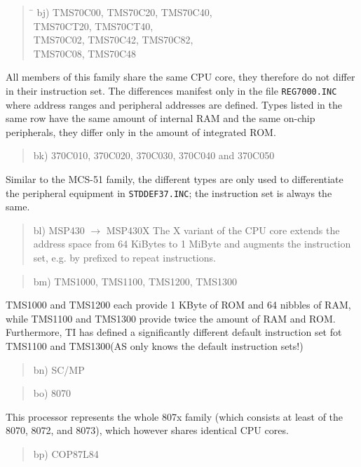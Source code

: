 \documentclass[12pt,twoside]{report}
\newcommand{\tty}[1]{{\tt #1}}
\begin{document}
\begin{quote}
\begin{tabbing}
\hspace{0.7cm} \= \kill
bj) \> TMS70C00, TMS70C20, TMS70C40,\\
    \> TMS70CT20, TMS70CT40,\\
    \> TMS70C02, TMS70C42, TMS70C82,\\
    \> TMS70C08, TMS70C48\\
\end{tabbing}
\end{quote}
All members of this family share the same CPU core, they therefore do not
differ in their instruction set.  The differences manifest only in the
file \tty{REG7000.INC} where address ranges and peripheral addresses are
defined.  Types listed in the same row have the same amount of internal
RAM and the same on-chip peripherals, they differ only in the amount of
integrated ROM.
\begin{quote}
bk) 370C010, 370C020, 370C030, 370C040 and 370C050
\end{quote}
Similar to the MCS-51 family, the different types are only used to
differentiate the peripheral equipment in \tty{STDDEF37.INC}; the
instruction set is always the same.
\begin{quote}
bl) MSP430 $\rightarrow$ MSP430X
The X variant of the CPU core extends the address space from 64
KiBytes to 1 MiByte and augments the instruction set, e.g. by
prefixed to repeat instructions.
\end{quote}
\begin{quote}
bm) TMS1000, TMS1100, TMS1200, TMS1300
\end{quote}
TMS1000 and TMS1200 each provide 1 KByte of ROM and 64 nibbles of
RAM, while TMS1100 and TMS1300 provide twice the amount of RAM
and ROM.  Furthermore, TI has defined a significantly different
default instruction set fot TMS1100 and TMS1300(AS only knows the
default instruction sets!)
\begin{quote}
bn) SC/MP
\end{quote}
\begin{quote}
bo) 8070
\end{quote}
This processor represents the whole 807x family (which consists at least
of the 8070, 8072, and 8073), which however shares identical CPU cores.
\begin{quote}
bp) COP87L84
\end{quote}
\end{document}
